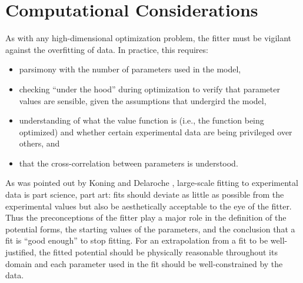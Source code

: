 \section{Computational Considerations}
As with any high-dimensional optimization problem, the fitter must be vigilant
against the overfitting of data. In practice, this requires:
\begin{itemize}
    \item parsimony with the number of parameters used in the model, 
    \item checking ``under the hood'' during optimization to verify that
        parameter values are sensible, given the assumptions that undergird the model,
    \item understanding of what the value function is (i.e., the function being
        optimized) and whether certain experimental data are being
        privileged over others, and
    \item that the cross-correlation between parameters is understood.
\end{itemize}
As was pointed out by Koning and Delaroche \cite{KoningDelaroche}, large-scale fitting to 
experimental data is part science, part art: fits should deviate as little as possible from the 
experimental values but also be aesthetically acceptable to the eye of the fitter.
Thus the preconceptions of the fitter play a major role in the definition of the
potential forms, the starting values of the parameters, and the conclusion that a fit is ``good
enough'' to stop fitting. For an extrapolation from a
fit to be well-justified, the fitted potential should be physically reasonable throughout its 
domain and each parameter used in the fit should be well-constrained by the data.

